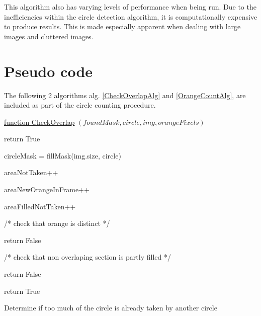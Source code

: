 \documentclass[conference]{IEEEtran}
\begin{document}
This algorithm also has varying levels of performance when being run. Due to the inefficiencies within the circle detection algorithm, it is computationally expensive to produce results. This is made especially apparent when dealing with large images and cluttered images.



\section{Pseudo code}

The following 2 algorithms alg. \ref{CheckOverlapAlg} and \ref{OrangeCountAlg}, are included as part of the circle counting procedure. 

\begin{algorithm} 

    \underline{function CheckOverlap} $(foundMask, circle, img, orangePixels)$\;
    
    {
      return True
    }
        
    circleMask = fillMask(img.size, circle)
    
    {
   {
    {
      areaNotTaken++
    }
    
    {
      areaNewOrangeInFrame++
    }
    
    {
      areaFilledNotTaken++
    }
   }
    }
    
    /* check that orange is distinct */
    
     {
  return False
    }
    
    /* check that non overlaping section is partly filled */
    
     {
  return False
    }
    
    return True
    
    \caption{Determine if too much of the circle is already taken by another circle} \label{CheckOverlapAlg}
\end{algorithm}
\end{document}
